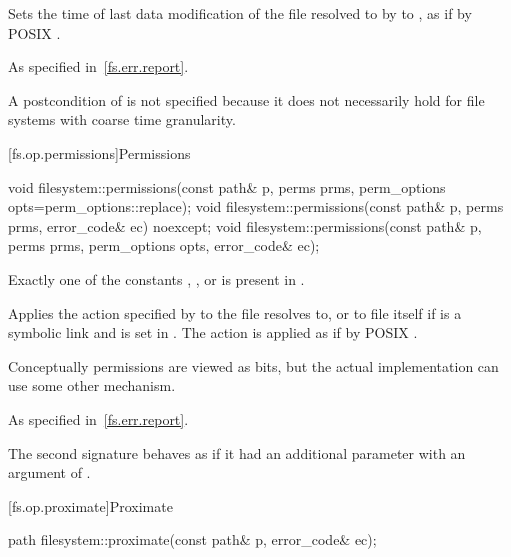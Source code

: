 \begin{itemdescr}
\pnum
\effects
Sets the time of last data modification of the file
  resolved to by  to , as if by POSIX .

\pnum
\throws
As specified in~\ref{fs.err.report}.

\pnum
\begin{note}
A postcondition of  is not specified
because it does not necessarily hold for file systems with coarse time granularity.
\end{note}
\end{itemdescr}

[fs.op.permissions]{Permissions}

%
\begin{itemdecl}
void filesystem::permissions(const path& p, perms prms, perm_options opts=perm_options::replace);
void filesystem::permissions(const path& p, perms prms, error_code& ec) noexcept;
void filesystem::permissions(const path& p, perms prms, perm_options opts, error_code& ec);
\end{itemdecl}

\begin{itemdescr}
\pnum
\expects
Exactly one of the  constants
, , or  is present in .

\pnum
\effects
Applies the action specified by 
to the file  resolves to,
or to file  itself if  is a symbolic link
and  is set in .
The action is applied as if by POSIX .

\pnum
\begin{note}
Conceptually permissions are viewed as bits, but the actual
implementation can use some other mechanism.
\end{note}

\pnum
\throws
As specified in~\ref{fs.err.report}.

\pnum
\remarks
The second signature behaves as if it had an additional parameter
  with an argument of .
\end{itemdescr}

[fs.op.proximate]{Proximate}

%
\begin{itemdecl}
path filesystem::proximate(const path& p, error_code& ec);
\end{itemdecl}

